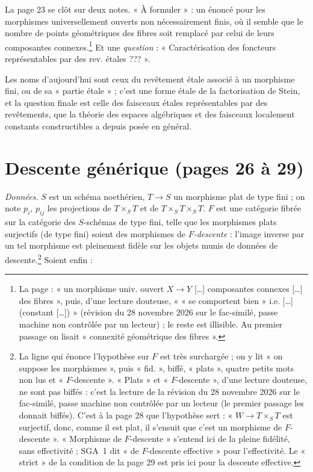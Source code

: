 \documentclass[11pt,a4paper]{article}
\begin{document}
La page 23 se clôt sur deux notes. « À formuler » : un énoncé pour les
morphismes universellement ouverts non nécessairement finis, où il semble que
le nombre de points géométriques des fibres soit remplacé par celui de
leurs composantes connexes.\footnote{La page : « un morphisme univ. ouvert $X \to Y$ […] composantes
connexes […] des fibres », puis, d'une lecture douteuse, « « se comportent
bien » i.e. […] (constant […]) » (révision du 28 novembre 2026 sur le fac-similé, passe machine non contrôlée par un lecteur) ; le reste est illisible. Au premier passage on
lisait « connexité géométrique des fibres ».} Et une
\emph{question} : « Caractérisation des foncteurs représentables par des
rev. étales ??? ».

Les noms d'aujourd'hui sont ceux du revêtement étale associé à un morphisme
fini, ou de sa « partie étale » ; c'est une forme étale de la factorisation de
Stein, et la question finale est celle des faisceaux étales représentables par
des revêtements, que la théorie des espaces algébriques et des faisceaux
localement constants constructibles a depuis posée en général.

\section*{Descente générique (pages 26 à 29)}

\emph{Données.} $S$ est un schéma noethérien, $T \to S$ un morphisme plat de
type fini ; on note $p_i$, $p_{ij}$ les projections de $T \times_S T$ et de
$T \times_S T \times_S T$. $F$ est une catégorie fibrée sur la catégorie des
$S$-schémas de type fini, telle que les morphismes plats surjectifs (de type
fini) soient des morphismes de \emph{$F$-descente} : l'image inverse par un tel
morphisme est pleinement fidèle sur les objets munis de données de
descente.\footnote{La ligne qui énonce l'hypothèse sur $F$ est très
surchargée ; on y lit « on suppose les morphismes », puis « fid. », biffé,
« plats », quatre petits mots non lus et « $F$-descente ». « Plats » et
« $F$-descente », d'une lecture douteuse, ne sont pas biffés : c'est la lecture
de la révision du 28 novembre 2026 sur le fac-similé, passe machine non contrôlée par un lecteur (le premier passage les donnait biffés). C'est à la page 28 que l'hypothèse sert : « $W
\to T \times_S T$ est surjectif, donc, comme il est plat, il s'ensuit que
c'est un morphisme de $F$-descente ». « Morphisme de $F$-descente » s'entend
ici de la pleine fidélité, sans effectivité ; SGA~1 dit « de $F$-descente
effective » pour l'effectivité. Le « strict » de la condition de la page 29 est
pris ici pour la descente effective.} Soient
enfin :
\end{document}
